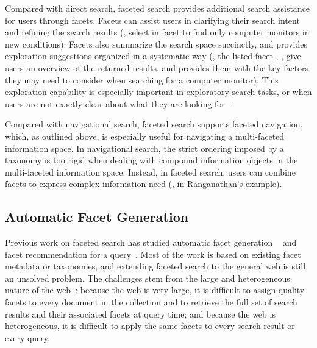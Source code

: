 Compared with direct search, faceted search provides additional search assistance for users through facets. Facets can assist users in clarifying their search intent and refining the search results (\eg, select  in facet  to find only computer monitors in new conditions). Facets also summarize the search space succinctly, and provides exploration suggestions organized in a systematic way (\eg, the listed facet , ,  give users an overview of the returned results, and provides them with the key factors they may need to consider when searching for a computer monitor). This exploration capability is especially important in exploratory search tasks, or when users are not exactly clear about what they are looking for~\cite{kules2009exploratory,sacco2009dynamic}.

Compared with navigational search, faceted search supports faceted navigation, which, as outlined above, is especially useful for navigating a multi-faceted information space. In navigational search, the strict ordering imposed by a taxonomy is too rigid when dealing with compound information objects in the multi-faceted information space. Instead, in faceted search, users can combine facets to express complex information need (\eg,  in  Ranganathan's example).

\subsection{Automatic Facet Generation}
Previous work on faceted search has studied automatic facet generation ~\cite{dakka2008automatic,li2010facetedpedia,stoica2007automating,oren2006extending,kohlschutter2006using,latha2010afgf} and facet recommendation for a query~\cite{dash2008dynamic,koren2008personalized}. Most of the work is based on existing facet metadata or taxonomies, and extending faceted search to the general web is still an unsolved problem. The challenges stem from the large and heterogeneous nature of the web~\cite{teevan2008challenges}: because the web is very large, it is
difficult to assign quality facets to every document in the collection and to retrieve the full set of search results and their associated facets at query time; and because the web is heterogeneous, it is difficult to apply the same facets to every search result or every query.


